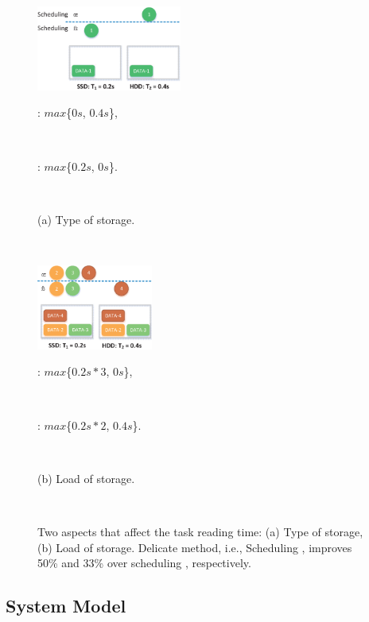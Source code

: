 \documentclass[conference]{IEEEtran}
\begin{document}
\begin{figure}[!t]
\centering
    \begin{minipage}{4.78cm}
        \includegraphics[height = 2.8cm]{fig_example1_5.eps}
        \centerline{\footnotesize{\uppercase\expandafter{} : $max$\{$0s$, $0.4s$\},\quad}}\\
        \centerline{\footnotesize{\uppercase\expandafter{} : $max$\{$0.2s$, $0s$\}.\quad}}\\
         \centerline{(a) Type of storage.}\\
    \end{minipage}
    \begin{minipage}{3.95cm}
        \includegraphics[height = 2.8cm]{fig_example2_4.eps}
        \centerline{\footnotesize{\uppercase\expandafter{} : $max$\{$0.2s*3$, $0s$\},\quad}}\\
        \centerline{\footnotesize{\uppercase\expandafter{} : $max$\{$0.2s*2$, $0.4s$\}.}}\\
         \centerline{(b) Load of storage.\quad}\\
    \end{minipage}
    \vspace{-0.4cm}
    \caption{Two aspects that affect the task reading time: (a) Type of storage, (b) Load of storage. Delicate method, i.e., Scheduling \uppercase\expandafter{}, improves 50\% and 33\% over scheduling \uppercase\expandafter{}, respectively.}
    \label{Fig:example}
    \vspace{-0.4cm}
\end{figure}

\subsection{System Model}
\end{document}
